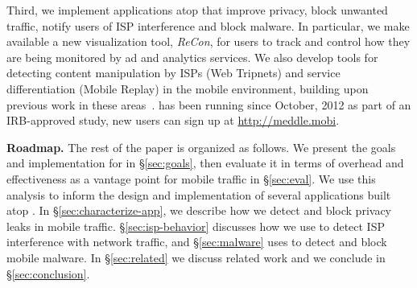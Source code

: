 Third, we implement applications atop \meddle that improve 
privacy, block unwanted traffic, notify users of ISP interference and block malware. 
In particular, we make available a new visualization tool, \emph{ReCon}, for users to track and control how 
they are being monitored by ad and analytics services. 
 We also develop tools for detecting content manipulation by ISPs (Web Tripnets) and 
 service differentiation (Mobile Replay) in the mobile environment, building upon previous 
 work in these areas~\cite{reis:tripwires,dischinger:glasnost}. 
\meddle has been running since 
October, 2012 as part of an IRB-approved study, new users can sign up at \url{http://meddle.mobi}. 






\noindent\textbf{Roadmap.} The rest of the paper is organized as follows. We present the goals and implementation for \meddle in \S\ref{sec:goals}, then evaluate it in terms of overhead and effectiveness as a vantage point for mobile traffic in \S\ref{sec:eval}. We use this analysis to inform the design and implementation of several applications built atop \meddle. 
In \S\ref{sec:characterize-app}, we describe how we detect and block privacy leaks in mobile traffic. \S\ref{sec:isp-behavior} discusses 
how we use \meddle to detect ISP interference with network traffic, and \S\ref{sec:malware} uses \meddle to detect and block mobile malware. In \S\ref{sec:related} we discuss related work and we conclude in \S\ref{sec:conclusion}.

